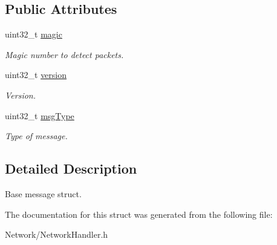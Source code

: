 \subsection*{Public Attributes}
\begin{DoxyCompactItemize}
\item 
\mbox{\label{structNetworkHandler_1_1Message_a223522c0b8a50767dd4440998a723ce8}} 
uint32\+\_\+t \mbox{\hyperlink{structNetworkHandler_1_1Message_a223522c0b8a50767dd4440998a723ce8}{magic}}
\begin{DoxyCompactList}\small\item\em Magic number to detect packets. \end{DoxyCompactList}\item 
\mbox{\label{structNetworkHandler_1_1Message_a806b0186d262219408b53c7137489034}} 
uint32\+\_\+t \mbox{\hyperlink{structNetworkHandler_1_1Message_a806b0186d262219408b53c7137489034}{version}}
\begin{DoxyCompactList}\small\item\em Version. \end{DoxyCompactList}\item 
\mbox{\label{structNetworkHandler_1_1Message_a3a05df44411cb9ac7c8a7842a5afbff4}} 
uint32\+\_\+t \mbox{\hyperlink{structNetworkHandler_1_1Message_a3a05df44411cb9ac7c8a7842a5afbff4}{msg\+Type}}
\begin{DoxyCompactList}\small\item\em Type of message. \end{DoxyCompactList}\end{DoxyCompactItemize}


\subsection{Detailed Description}
Base message struct. 

The documentation for this struct was generated from the following file\+:\begin{DoxyCompactItemize}
\item 
Network/Network\+Handler.\+h\end{DoxyCompactItemize}
